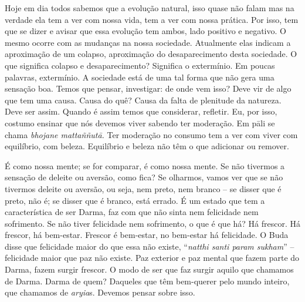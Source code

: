 Hoje em dia todos sabemos que a evolução natural, isso quase não
falam mas na verdade ela tem a ver com nossa vida, tem a ver com nossa
prática. Por isso, tem que se dizer e avisar que essa evolução tem
ambos, lado positivo e negativo. O mesmo ocorre com as mudanças na
nossa sociedade. Atualmente elas indicam a aproximação de um colapso,
aproximação do desaparecimento desta sociedade. O que significa colapso
e desaparecimento? Significa o extermínio. Em poucas palavras,
extermínio. A sociedade está de uma tal forma que não gera uma sensação
boa. Temos que pensar, investigar: de onde vem isso? Deve vir de algo
que tem uma causa. Causa do quê? Causa da falta de plenitude da
natureza. Deve ser assim. Quando é assim temos que considerar,
refletir. Eu, por isso, costumo ensinar que nós devemos viver sabendo
ter moderação. Em pāli se chama \textit{bhojane mattaññutā.} Ter
moderação no consumo tem a ver com viver com equilíbrio, com beleza.
Equilíbrio e beleza não têm o que adicionar ou remover. 

É como nossa mente; se for comparar, é como nossa mente. Se não
tivermos a sensação de deleite ou aversão, como fica? Se olharmos,
vamos ver que se não tivermos deleite ou aversão, ou seja, nem preto,
nem branco – se disser que é preto, não é; se disser que é branco, está
errado. É um estado que tem a característica de ser Darma, faz com que
não sinta nem felicidade nem sofrimento. Se não tiver felicidade nem
sofrimento, o que é que há? Há frescor. Há frescor, há bem-estar.
Frescor é bem-estar, no bem-estar há felicidade. O Buda disse que
felicidade maior do que essa não existe, “\textit{natthi santi param
sukham}” – felicidade maior que paz não existe. Paz exterior e
paz mental que fazem parte do Darma, fazem surgir frescor. O modo de
ser que faz surgir aquilo que chamamos de Darma. Darma de quem?
Daqueles que têm bem-querer pelo mundo inteiro, que chamamos de
\textit{aryia}s. Devemos pensar sobre isso. 

